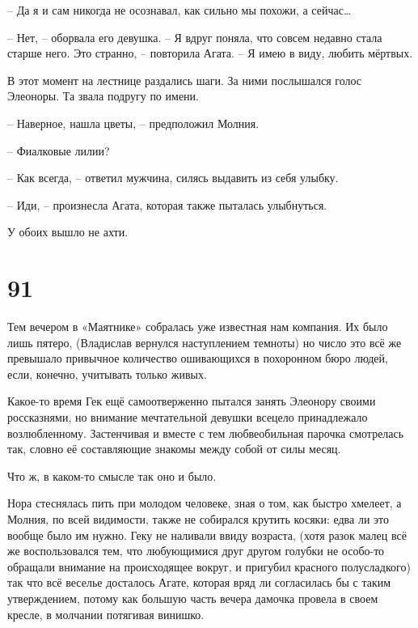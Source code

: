 \documentclass[
  a5paperpaper,
  DIV=11,
  numbers=noendperiod]{scrreprt}
\begin{document}
-- Да я и сам никогда не осознавал, как сильно мы похожи, а
сейчас\ldots{}

-- Нет, -- оборвала его девушка. -- Я вдруг поняла, что совсем недавно
стала старше него. Это странно, -- повторила Агата. -- Я имею в виду,
любить мёртвых.

В этот момент на лестнице раздались шаги. За ними послышался голос
Элеоноры. Та звала подругу по имени.

-- Наверное, нашла цветы, -- предположил Молния.

-- Фиалковые лилии?

-- Как всегда, -- ответил мужчина, силясь выдавить из себя улыбку.

-- Иди, -- произнесла Агата, которая также пыталась улыбнуться.

У обоих вышло не ахти.

\section*{91}\label{91}


Тем вечером в «Маятнике» собралась уже известная нам компания. Их было
лишь пятеро, (Владислав вернулся наступлением темноты) но число это всё
же превышало привычное количество ошивающихся в похоронном бюро людей,
если, конечно, учитывать только живых.

Какое-то время Гек ещё самоотверженно пытался занять Элеонору своими
россказнями, но внимание мечтательной девушки всецело принадлежало
возлюбленному. Застенчивая и вместе с тем любвеобильная парочка
смотрелась так, словно её составляющие знакомы между собой от силы
месяц.

Что ж, в каком-то смысле так оно и было.

Нора стеснялась пить при молодом человеке, зная о том, как быстро
хмелеет, а Молния, по всей видимости, также не собирался крутить косяки:
едва ли это вообще было им нужно. Геку не наливали ввиду возраста, (хотя
разок малец всё же воспользовался тем, что любующимися друг другом
голубки не особо-то обращали внимание на происходящее вокруг, и пригубил
красного полусладкого) так что всё веселье досталось Агате, которая вряд
ли согласилась бы с таким утверждением, потому как большую часть вечера
дамочка провела в своем кресле, в молчании потягивая винишко.
\end{document}
